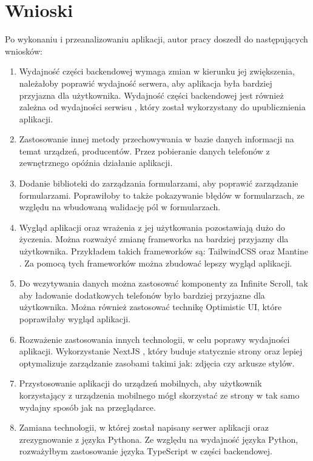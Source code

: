 \section{Wnioski}
Po wykonaniu i przeanalizowaniu aplikacji, autor pracy doszedł do następujących wniosków:
\begin{enumerate}
  \item Wydajność części backendowej wymaga zmian w kierunku jej zwiększenia, należałoby poprawić wydajność serwera, aby aplikacja była bardziej przyjazna dla użytkownika. Wydajność części backendowej jest również zależna od wydajności serwisu \cite{render}, który został wykorzystany do upublicznienia aplikacji.
  \item Zastosowanie innej metody przechowywania w bazie danych informacji na temat urządzeń, producentów. Przez pobieranie danych telefonów z zewnętrznego opóźnia działanie aplikacji.
  \item Dodanie biblioteki do zarządzania formularzami, aby poprawić zarządzanie formularzami. Poprawiłoby to także pokazywanie błędów w formularzach, ze względu na wbudowaną walidację pól w formularzach.
  \item Wygląd aplikacji oraz wrażenia z jej użytkowania pozostawiają dużo do życzenia. Można rozważyć zmianę frameworka na bardziej przyjazny dla użytkownika. Przykładem takich frameworków są: TailwindCSS \cite{tailwindcss} oraz Mantine \cite{mantine}. Za pomocą tych frameworków można zbudować lepszy wygląd aplikacji.
  \item Do wczytywania danych można zastosować komponenty za Infinite Scroll, tak aby ładowanie dodatkowych telefonów było bardziej przyjazne dla użytkownika. Można również zastosować technikę Optimistic UI, które poprawiłaby wygląd aplikacji.
  \item Rozważenie zastosowania innych technologii, w celu poprawy wydajności aplikacji. Wykorzystanie NextJS \cite{nextjs}, który buduje statycznie strony oraz lepiej optymalizuje zarządzanie zasobami takimi jak: zdjęcia czy arkusze stylów.
  \item Przystosowanie aplikacji do urządzeń mobilnych, aby użytkownik korzystający z urządzenia mobilnego mógł skorzystać ze strony w tak samo wydajny sposób jak na przeglądarce.
  \item Zamiana technologii, w której został napisany serwer aplikacji oraz zrezygnowanie z języka Pythona. Ze względu na wydajność języka Python, rozważyłbym zastosowanie języka TypeScript w części backendowej.
\end{enumerate}

